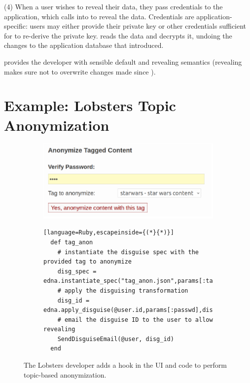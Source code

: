 %
(4) When a user wishes to reveal their \xxed data, they pass credentials
to the application, which calls into \sys to reveal the data.
%
Credentials are application-specific: users may either provide their private
key or other credentials sufficient for \sys to re-derive the private key.
%
\sys reads the \xxed data and decrypts it, undoing the changes to the
application database that \xxing introduced.
%

%
\sys provides the developer with sensible default \xxing and revealing
semantics (\eg revealing makes sure not to overwrite changes made since
\xxing).

\section{Example: Lobsters Topic Anonymization}
\label{s:design:lobsters}

\begin{figure}[h]
  \centering
  \begin{subfigure}[h]{0.5\columnwidth}
  \includegraphics[width=\columnwidth]{figs/lobsters_catanon}
  \end{subfigure}
  \begin{subfigure}[h]{\columnwidth}
  \begin{lstlisting}[language=Ruby,escapeinside={(*}{*)}]
  def tag_anon
    # instantiate the disguise spec with the provided tag to anonymize
    disg_spec = edna.instantiate_spec("tag_anon.json",params[:tag])
    # apply the disguising transformation
    disg_id = edna.apply_disguise(@user.id,params[:passwd],disg_spec)
    # email the disguise ID to the user to allow revealing
    SendDisguiseEmail(@user, disg_id)
  end
  \end{lstlisting}
  \end{subfigure}
  \vspace*{-1em}
    \caption[Hook to invoke topic-based anonymization.]{The Lobsters developer adds a hook in the UI and code to perform
      topic-based anonymization.}
  \label{f:lobsters_hook}
  \end{figure}


